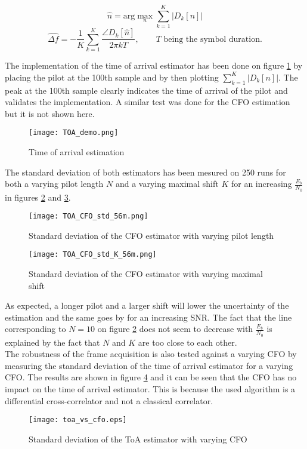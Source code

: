 \begin{equation*}
    \hat{n} = \text{arg} \max_n \sum_{k=1}^{K} |D_k[n]|
\end{equation*}
\begin{equation*}
    \hat{\Delta f} = -\frac{1}{K} \sum_{k=1}^{K} \frac{\angle D_k[\hat{n}]}{2\pi kT}, \qquad T \text{ being the symbol duration.}
\end{equation*}

The implementation of the time of arrival estimator has been done on figure \ref{fig:TOA_demo} by placing the pilot at the 100th sample and by then plotting $\sum_{k=1}^{K} |D_k[n]|$. The peak at the 100th sample clearly indicates the time of arrival of the pilot and validates the implementation. A similar test was done for the CFO estimation but it is not shown here. \\

\begin{figure}[H]
    \centering
    \texttt{[image: TOA\_demo.png]}
    \caption{Time of arrival estimation}
    \label{fig:TOA_demo}
\end{figure}

The standard deviation of both estimators has been mesured on 250 runs for both a varying pilot length $N$ and a varying maximal shift $K$ for an increasing $\frac{E_b}{N_0}$ in figures \ref{fig:TOA_CFO_std_N} and \ref{fig:TOA_CFO_std_K}. 

\begin{figure}[H]
    \centering
    \texttt{[image: TOA\_CFO\_std\_56m.png]}
    \caption{Standard deviation of the CFO estimator with varying pilot length}
    \label{fig:TOA_CFO_std_N}
\end{figure}

\begin{figure}[H]
    \centering
    \texttt{[image: TOA\_CFO\_std\_K\_56m.png]}
    \caption{Standard deviation of the CFO estimator with varying maximal shift}
    \label{fig:TOA_CFO_std_K}
\end{figure}

As expected, a longer pilot and a larger shift will lower the uncertainty of the estimation and the same goes by for an increasing SNR. The fact that the line corresponding to $N = 10$ on figure \ref{fig:TOA_CFO_std_N} does not seem to decrease with $\frac{E_b}{N_0}$ is explained by the fact that $N$ and $K$ are too close to each other.\\
The robustness of the frame acquisition is also tested against a varying CFO by measuring the standard deviation of the time of arrival estimator for a varying CFO. The results are shown in figure \ref{fig:TOA_std_CFO} and it can be seen that the CFO has no impact on the time of arrival estimator. This is because the used algorithm is a differential cross-correlator and not a classical correlator. \\

\begin{figure}[H]
    \centering
    \texttt{[image: toa\_vs\_cfo.eps]}
    \caption{Standard deviation of the ToA estimator with varying CFO}
    \label{fig:TOA_std_CFO}
\end{figure}
